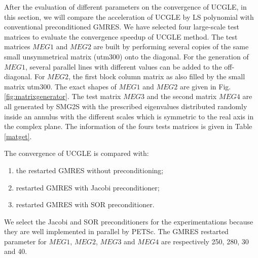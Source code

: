 After the evaluation of different parameters on the convergence of UCGLE, in this section, we will compare the acceleration of UCGLE by LS polynomial with conventional preconditioned GMRES. We have selected four large-scale test matrices to evaluate the convergence speedup of UCGLE method. The test matrices $MEG1$ and $MEG2$ are built by performing several copies of the same small unsymmetrical matrix (utm300) onto the diagonal. For the generation of $MEG1$, several parallel lines with different values can be added to the off-diagonal. For $MEG2$, the first block column matrix as also filled by the small matrix utm300. The exact shapes of $MEG1$ and $MEG2$ are given in Fig. \ref{fig:matrixgenerator}. The test matrix $MEG3$ and the second matrix $MEG4$ are all generated by SMG2S with the prescribed eigenvalues distributed randomly inside an annulus with the different scales which is symmetric to the real axis in the complex plane. The information of the fours tests matrices is given in Table \ref{matget}. 

The convergence of UCGLE is compared with:

\begin{enumerate}[label=(\arabic*)]
	\item the restarted GMRES without preconditioning;
	\item restarted GMRES with Jacobi preconditioner;
	\item restarted GMRES with SOR preconditioner. 
\end{enumerate}

We select the Jacobi and SOR preconditioners for the experimentations because they are well implemented in parallel by PETSc. The GMRES restarted parameter for $MEG1$, $MEG2$, $MEG3$ and $MEG4$ are respectively 250, 280, 30 and 40.

